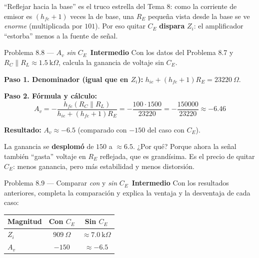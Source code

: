 \documentclass[11pt,a4paper]{article}
\newcommand{\intermedio}{\textcolor{naranjaVivo}{\faIcon{circle}\,\textbf{Intermedio}}}
\begin{document}
\begin{porqueBox}
``Reflejar hacia la base'' es el truco estrella del Tema 8: como la corriente de emisor es $(h_{fe}+1)$ veces la de base, una $R_E$ pequeña vista desde la base se ve \emph{enorme} (multiplicada por $101$). Por eso quitar $C_E$ \textbf{dispara} $Z_i$: el amplificador ``estorba'' menos a la fuente de señal.
\end{porqueBox}

\begin{problemaBox}{Problema 8.8 --- $A_v$ \emph{sin} $C_E$ \quad \intermedio}
Con los datos del Problema 8.7 y $R_C\parallel R_L\approx1.5\ \text{k}\Omega$, calcula la ganancia de voltaje sin $C_E$.
\end{problemaBox}

\begin{solucionBox}
\textbf{Paso 1. Denominador (igual que en $Z_i$):} $h_{ie}+(h_{fe}+1)R_E=23220\ \Omega$.

\textbf{Paso 2. Fórmula y cálculo:}
\[
A_v=-\frac{h_{fe}(R_C\parallel R_L)}{h_{ie}+(h_{fe}+1)R_E}=-\frac{100\cdot1500}{23220}=-\frac{150000}{23220}\approx-6.46
\]

\textbf{Resultado:} $A_v\approx-6.5$ (comparado con $-150$ del caso con $C_E$).
\end{solucionBox}

\begin{porqueBox}
La ganancia se \textbf{desplomó} de $150$ a $\approx6.5$. ¿Por qué? Porque ahora la señal también ``gasta'' voltaje en $R_E$ reflejada, que es grandísima. Es el precio de quitar $C_E$: menos ganancia, pero más estabilidad y menos distorsión.
\end{porqueBox}

\begin{problemaBox}{Problema 8.9 --- Comparar \emph{con} y \emph{sin} $C_E$ \quad \intermedio}
Con los resultados anteriores, completa la comparación y explica la ventaja y la desventaja de cada caso:
\begin{center}
\begin{tabularx}{0.9\linewidth}{@{} l c c @{}}
\toprule
\textbf{Magnitud} & \textbf{Con $C_E$} & \textbf{Sin $C_E$} \\
\midrule
$Z_i$ & $909\ \Omega$ & $\approx7.0\ \text{k}\Omega$ \\
$A_v$ & $-150$ & $\approx-6.5$ \\
\bottomrule
\end{tabularx}
\end{center}
\end{problemaBox}
\end{document}
